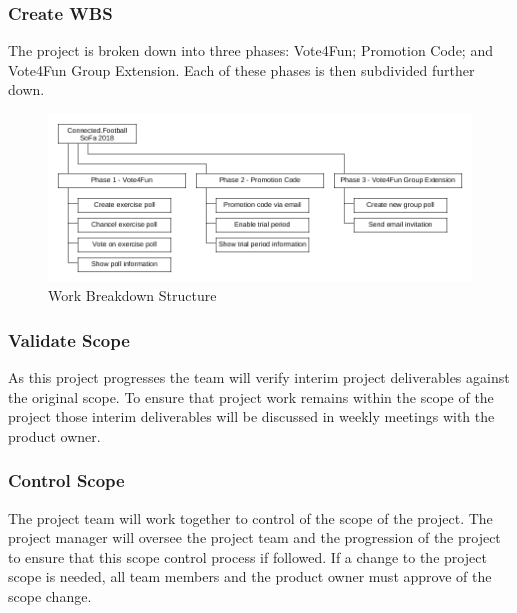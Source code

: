 \subsubsection{Create WBS}
\label{sssec:create_wbs}

The project is broken down into three phases: Vote4Fun; Promotion Code; and Vote4Fun Group Extension. Each of these phases is then subdivided further down.

\begin{figure}[H]
	\includegraphics[width=\textwidth]{images/wbs.png}
	\caption{Work Breakdown Structure}
    \label{fig:wbs}
\end{figure}

\subsubsection{Validate Scope}
\label{sssec:validate_scope}
    
As this project progresses the team will verify interim project deliverables against the original scope. To ensure that project work remains within the scope of the project those interim deliverables will be discussed in weekly meetings with the product owner.

\subsubsection{Control Scope}
\label{sssec:control_scope}

The project team will work together to control of the scope of the project. The project manager will oversee the project team and the progression of the project to ensure that this scope control process if followed.
\newline
If a change to the project scope is needed, all team members and the product owner must approve of the scope change.


